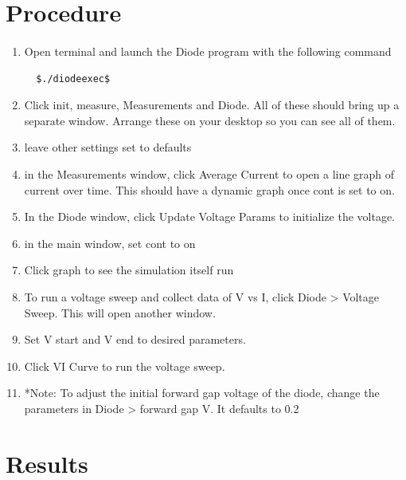 \documentclass[a4paper]{article}
\begin{document}
\section{Procedure}
\paragraph{}
\begin{enumerate}
\item Open terminal and launch the Diode program with the following command
\begin{verbatim}
  $./diodeexec$
\end{verbatim}
\item Click init, measure, Measurements and Diode. All of these should bring up a separate window. Arrange these on your desktop so you can see all of them.
\item leave other settings set to defaults
\item in the Measurements window, click Average Current to open a line graph of current over time. This should have a dynamic graph once cont is set to on.
\item In the Diode window, click Update Voltage Params to initialize the voltage.
\item in the main window, set cont to on
\item Click graph to see the simulation itself run
\item To run a voltage sweep and collect data of V vs I, click Diode > Voltage Sweep. This will open another window.
\item Set V start and V end to desired parameters.
\item Click VI Curve to run the voltage sweep.
\item *Note: To adjust the initial forward gap voltage of the diode, change the parameters in Diode > forward gap V. It defaults to 0.2
\end{enumerate}

\section{Results}
\paragraph{}
\end{document}
